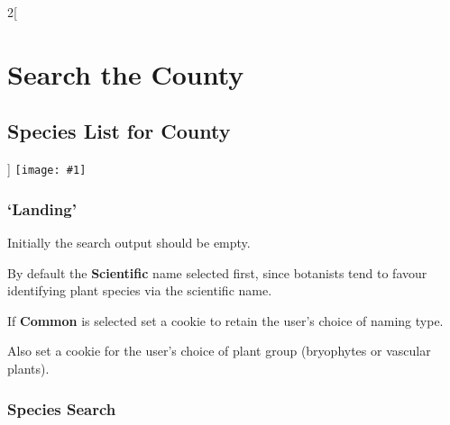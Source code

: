 \documentclass[a4paper,12pt,landscape]{article}
\newcommand{\wireframe}[1]{\texttt{[image: \#1]}\clearpage}
\begin{document}
\begin{multicols*}{2}[%
  \section{Search the County}%
  \subsection{Species List for County}%
  \label{sec:species-list-for-county}%
]
\thispagestyle{empty}
\wireframe{./wireframes/Species__ListForCounty.png}%

\subsubsection*{`Landing'} 

\begin{todolist}
  \item Initially the search output should be empty.
  \item By default the \textbf{Scientific} name selected first,
  since botanists tend to favour identifying
  plant species via the scientific name.
  \item If \textbf{Common} is selected set a cookie to retain the user's choice of naming type.
  \item Also set a cookie for the user's choice of plant group (bryophytes or vascular plants).
\end{todolist}

\subsubsection*{Species Search}


\end{multicols*}
\end{document}
